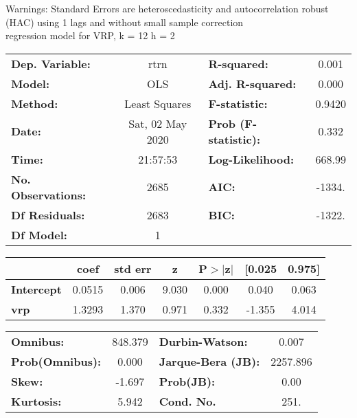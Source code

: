 Warnings: \newline
 [1] Standard Errors are heteroscedasticity and autocorrelation robust (HAC) using 1 lags and without small sample correction\\ 

regression model for VRP, k = 12 h = 2\begin{center}
\begin{tabular}{lclc}
\toprule
\textbf{Dep. Variable:}    &       rtrn       & \textbf{  R-squared:         } &     0.001   \\
\textbf{Model:}            &       OLS        & \textbf{  Adj. R-squared:    } &     0.000   \\
\textbf{Method:}           &  Least Squares   & \textbf{  F-statistic:       } &    0.9420   \\
\textbf{Date:}             & Sat, 02 May 2020 & \textbf{  Prob (F-statistic):} &    0.332    \\
\textbf{Time:}             &     21:57:53     & \textbf{  Log-Likelihood:    } &    668.99   \\
\textbf{No. Observations:} &        2685      & \textbf{  AIC:               } &    -1334.   \\
\textbf{Df Residuals:}     &        2683      & \textbf{  BIC:               } &    -1322.   \\
\textbf{Df Model:}         &           1      & \textbf{                     } &             \\
\bottomrule
\end{tabular}
\begin{tabular}{lcccccc}
                   & \textbf{coef} & \textbf{std err} & \textbf{z} & \textbf{P$> |$z$|$} & \textbf{[0.025} & \textbf{0.975]}  \\
\midrule
\textbf{Intercept} &       0.0515  &        0.006     &     9.030  &         0.000        &        0.040    &        0.063     \\
\textbf{vrp}       &       1.3293  &        1.370     &     0.971  &         0.332        &       -1.355    &        4.014     \\
\bottomrule
\end{tabular}
\begin{tabular}{lclc}
\textbf{Omnibus:}       & 848.379 & \textbf{  Durbin-Watson:     } &    0.007  \\
\textbf{Prob(Omnibus):} &   0.000 & \textbf{  Jarque-Bera (JB):  } & 2257.896  \\
\textbf{Skew:}          &  -1.697 & \textbf{  Prob(JB):          } &     0.00  \\
\textbf{Kurtosis:}      &   5.942 & \textbf{  Cond. No.          } &     251.  \\
\bottomrule
\end{tabular}
\end{center}

